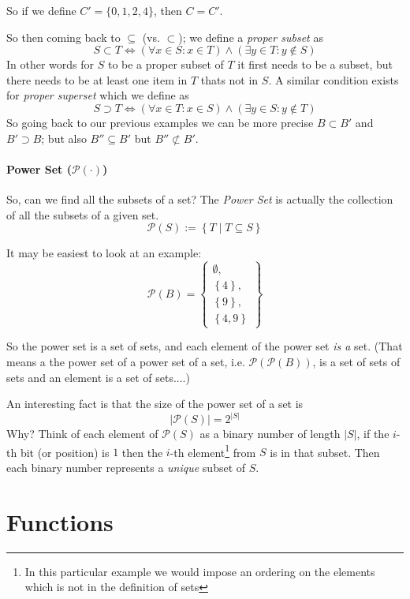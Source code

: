 So if we define $C' = \{0,1,2,4\}$, then $C=C'$.

So then coming back to $\subseteq$ (vs. $\subset$); 
we define a \emph{proper subset} as
\[
S \subset T \iff \left(\forall x \in S : x \in T\right) \wedge \left(\exists y \in T : y \notin S\right)
\]
In other words for $S$ to be a proper subset of $T$ it first needs to be a subset, but there needs to be at least one item in $T$ thats not in $S$.
A similar condition exists for \emph{proper superset} which we define as 
\[
S \supset T \iff \left(\forall x \in T : x \in S\right) \wedge \left(\exists y \in S : y \notin T\right)
\]
So going back to our previous examples we can be  more precise $B \subset B'$ and $B' \supset B$;
but also $B'' \subseteq B'$ but $B'' \not\subset B'$.

\paragraph{Power Set ($\mathcal{P}(\cdot)$)}

So, can we find all the subsets of a set?  
The \emph{Power Set} is actually the collection of all the subsets of a given set. 
\[
\mathcal{P}(S) := \left\{T \mid T \subseteq S\right\}
\]

It may be easiest to look at an example: 
\[
\mathcal{P}\left(B\right) = \left\{ \begin{matrix}\emptyset, \\ \left\{4\right\}, \\ \left\{9\right\}, \\\left\{4,9\right\}\end{matrix} \right\}
\]

So the power set is a set of sets, and each element of the power set \textit{is a} set.
(That means a the power set of a power set of a set, i.e. $\mathcal{P}\left(\mathcal{P}\left(B\right)\right)$, is a set of sets of sets and an element is a set of sets....) 

An interesting fact is that the size of the power set of a set is 
\[
\left|\mathcal{P}\left(S\right)\right| = 2^{|S|}
\]
Why? Think of each element of $\mathcal{P}\left(S\right)$ as a binary number of length $|S|$, 
if the $i$-th bit (or position) is $1$ then the $i$-th element\footnote{In this particular example we would impose an ordering on the elements which is not in the definition of sets} from $S$ is in that subset. 
Then each binary number represents a \textit{unique} subset of $S$. 

\section{Functions}

